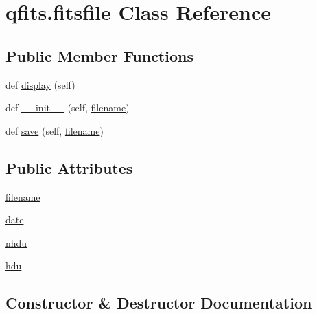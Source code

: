 \hypertarget{classqfits_1_1fitsfile}{}\section{qfits.\+fitsfile Class Reference}
\label{classqfits_1_1fitsfile}
\subsection*{Public Member Functions}
\begin{DoxyCompactItemize}
\item 
def \hyperlink{classqfits_1_1fitsfile_a1412887038ee0f4a85c28910ce26e8e8}{display} (self)
\item 
def \hyperlink{classqfits_1_1fitsfile_a6bbf32b74f013f7f65bb53ae4c40283d}{\+\_\+\+\_\+init\+\_\+\+\_\+} (self, \hyperlink{classqfits_1_1fitsfile_a576ce29b9c2bb364b4588e1925bdff87}{filename})
\item 
def \hyperlink{classqfits_1_1fitsfile_a6e96ab1f3bf9615a62661840ec8ae145}{save} (self, \hyperlink{classqfits_1_1fitsfile_a576ce29b9c2bb364b4588e1925bdff87}{filename})
\end{DoxyCompactItemize}
\subsection*{Public Attributes}
\begin{DoxyCompactItemize}
\item 
\hyperlink{classqfits_1_1fitsfile_a576ce29b9c2bb364b4588e1925bdff87}{filename}
\item 
\hyperlink{classqfits_1_1fitsfile_a843327c2e5b4722c6df053c47105bade}{date}
\item 
\hyperlink{classqfits_1_1fitsfile_af54a0303e40b6ac06e3e58f1d27c850d}{nhdu}
\item 
\hyperlink{classqfits_1_1fitsfile_a25a8aba36e2c82b9567c78e054742bd4}{hdu}
\end{DoxyCompactItemize}


\subsection{Constructor \& Destructor Documentation}
\mbox{\label{classqfits_1_1fitsfile_a6bbf32b74f013f7f65bb53ae4c40283d}} 
